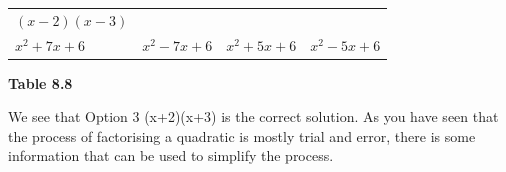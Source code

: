 {\begin{center}
\begin{xtabular*}{\mytablewidth}[t]{|p{10\mystarwidth}|p{10\mystarwidth}|p{10\mystarwidth}|p{10\mystarwidth}|}
                $\left(x-2\right)\left(x-3\right)$
     \tabularnewline{}
                ${x}^{2}+7x+6$
               &
                ${x}^{2}-7x+6$
               &
                \uline{
                  ${x}^{2}+5x+6$
                }
               &
                ${x}^{2}-5x+6$
     \tabularnewline{}
    \end{xtabular*}
      \end{center}
    \begin{center}{\small\bfseries Table 8.8}\end{center}
        }%
    \par
      \label{m39394*id276547}We see that Option 3 (x+2)(x+3) is the correct solution. As you have seen that the process of factorising a quadratic is mostly trial and error, there is some information that can be used to simplify the process.\par 
      \label{m39394*uid20}
